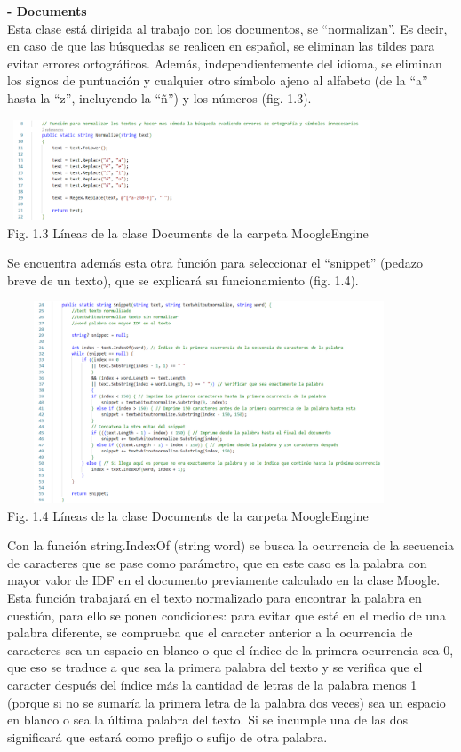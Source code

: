 \documentclass[letterpaper]{article}
\begin{document}
{\textbf{{\large- Documents}}\\

Esta clase está dirigida al trabajo con los documentos, se “normalizan”. Es decir, en caso de
que las búsquedas se realicen en español, se eliminan las tildes para evitar errores ortográficos.
Además, independientemente del idioma, se eliminan los signos de puntuación y cualquier otro
símbolo ajeno al alfabeto (de la “a” hasta la “z”, incluyendo la “ñ”) y los números (fig. 1.3).\\

\begin{center}
	\includegraphics[width=11cm, height=3cm]{fig 1.3.png}\\
	{\tiny Fig. 1.3 Líneas de la clase Documents de la carpeta MoogleEngine}
\end{center}

Se encuentra además esta otra función para seleccionar el “snippet” (pedazo breve de
un texto), que se explicará su funcionamiento (fig. 1.4).
\begin{center}
	\includegraphics[width=12cm, height=6cm]{fig 1.4.png}\\
	{\tiny Fig. 1.4 Líneas de la clase Documents de la carpeta MoogleEngine}
\end{center}

Con la función string.IndexOf (string word) se busca la ocurrencia de la secuencia de
caracteres que se pase como parámetro, que en este caso es la palabra con mayor valor de IDF
en el documento previamente calculado en la clase Moogle. Esta función trabajará en el texto
normalizado para encontrar la palabra en cuestión, para ello se ponen condiciones: para evitar
que esté en el medio de una palabra diferente, se comprueba que el caracter anterior a la
ocurrencia de caracteres sea un espacio en blanco o que el índice de la primera ocurrencia sea
0, que eso se traduce a que sea la primera palabra del texto y se verifica que el caracter
después del índice más la cantidad de letras de la palabra menos 1 (porque si no se sumaría la
primera letra de la palabra dos veces) sea un espacio en blanco o sea la última palabra del
texto. Si se incumple una de las dos significará que estará como prefijo o sufijo de otra palabra. \\

}
\end{document}
